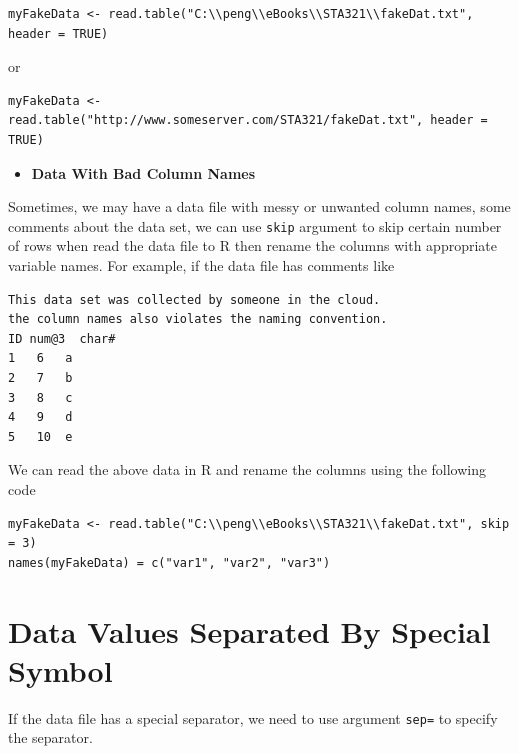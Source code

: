\documentclass[
]{book}
\providecommand{\tightlist}{%
  \setlength{\itemsep}{0pt}\setlength{\parskip}{0pt}}
\begin{document}
\begin{verbatim}
myFakeData <- read.table("C:\\peng\\eBooks\\STA321\\fakeDat.txt", header = TRUE)
\end{verbatim}

or

\begin{verbatim}
myFakeData <- read.table("http://www.someserver.com/STA321/fakeDat.txt", header = TRUE)
\end{verbatim}

\begin{itemize}
\tightlist
\item
  \textbf{Data With Bad Column Names}
\end{itemize}

Sometimes, we may have a data file with messy or unwanted column names, some comments about the data set, we can use \texttt{skip} argument to skip certain number of rows when read the data file to R then rename the columns with appropriate variable names. For example, if the data file has comments like

\begin{verbatim}
This data set was collected by someone in the cloud.
the column names also violates the naming convention.
ID num@3  char#
1   6   a
2   7   b
3   8   c
4   9   d
5   10  e
\end{verbatim}

We can read the above data in R and rename the columns using the following code

\begin{verbatim}
myFakeData <- read.table("C:\\peng\\eBooks\\STA321\\fakeDat.txt", skip = 3)
names(myFakeData) = c("var1", "var2", "var3")
\end{verbatim}

\hypertarget{data-values-separated-by-special-symbol}{%
\section{Data Values Separated By Special Symbol}\label{data-values-separated-by-special-symbol}}

If the data file has a special separator, we need to use argument \texttt{sep=} to specify the separator.
\end{document}
